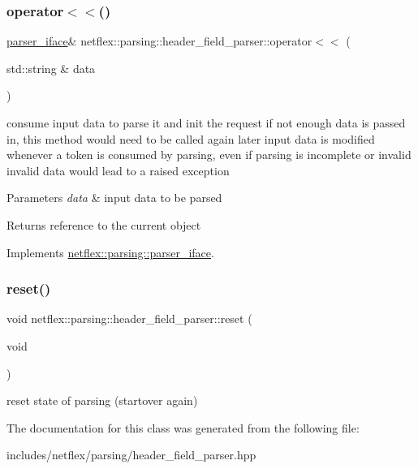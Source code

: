 \subsubsection{\texorpdfstring{operator$<$$<$()}{operator<<()}}
{\footnotesize\ttfamily \hyperlink{classnetflex_1_1parsing_1_1parser__iface}{parser\+\_\+iface}\& netflex\+::parsing\+::header\+\_\+field\+\_\+parser\+::operator$<$$<$ (\begin{DoxyParamCaption}\item[{std\+::string \&}]{data }\end{DoxyParamCaption})\hspace{0.3cm}{\ttfamily [virtual]}}

consume input data to parse it and init the request if not enough data is passed in, this method would need to be called again later input data is modified whenever a token is consumed by parsing, even if parsing is incomplete or invalid invalid data would lead to a raised exception


\begin{DoxyParams}{Parameters}
{\em data} & input data to be parsed \\
\hline
\end{DoxyParams}
\begin{DoxyReturn}{Returns}
reference to the current object 
\end{DoxyReturn}


Implements \hyperlink{classnetflex_1_1parsing_1_1parser__iface_a6b092567e70a5c0bf7568e94d06f7154}{netflex\+::parsing\+::parser\+\_\+iface}.

\mbox{\label{classnetflex_1_1parsing_1_1header__field__parser_a8c77c07cd5ec5c4f4c5961359b648768}} 
\subsubsection{\texorpdfstring{reset()}{reset()}}
{\footnotesize\ttfamily void netflex\+::parsing\+::header\+\_\+field\+\_\+parser\+::reset (\begin{DoxyParamCaption}\item[{void}]{ }\end{DoxyParamCaption})}

reset state of parsing (startover again) 

The documentation for this class was generated from the following file\+:\begin{DoxyCompactItemize}
\item 
includes/netflex/parsing/header\+\_\+field\+\_\+parser.\+hpp\end{DoxyCompactItemize}
